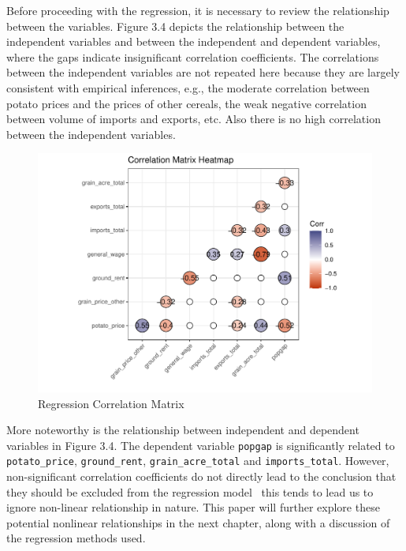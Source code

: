 Before proceeding with the regression, it is necessary to review the relationship between the variables. Figure 3.4 depicts the relationship between the independent variables and between the independent and dependent variables, where the gaps indicate insignificant correlation coefficients. The correlations between the independent variables are not repeated here because they are largely consistent with empirical inferences, e.g., the moderate correlation between potato prices and the prices of other cereals, the weak negative correlation between volume of imports and exports, etc. Also there is no high correlation between the independent variables.

\begin{figure}[htbp]
    \centering
    \caption{Regression Correlation Matrix}
    \includegraphics[width=.95\textwidth]{../03_outputs/corrmatrix.pdf}
\end{figure}

More noteworthy is the relationship between independent and dependent variables in Figure 3.4. The dependent variable \texttt{popgap} is significantly related  to \texttt{potato\_price}, \texttt{ground\_rent}, \texttt{grain\_acre\_total} and \texttt{imports\_total}. However, non-significant correlation coefficients do not directly lead to the conclusion that they should be excluded from the regression model \textemdash\ this tends to lead us to ignore non-linear relationship in nature. This paper will further explore these potential nonlinear relationships in the next chapter, along with a discussion of the regression methods used.
















